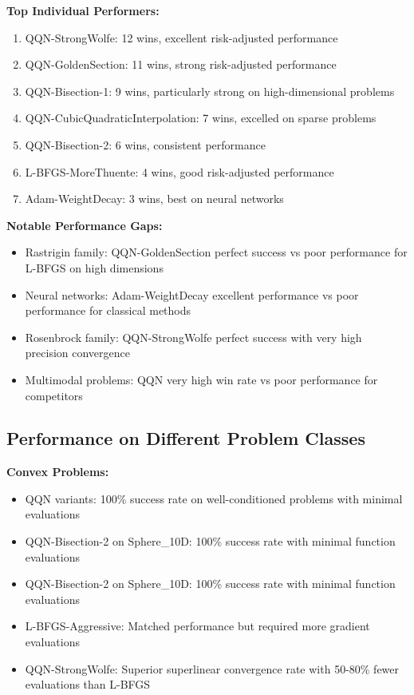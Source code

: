 \textbf{Top Individual Performers:}

\begin{enumerate}
\def\labelenumi{\arabic{enumi}.}
\tightlist
\item
  QQN-StrongWolfe: 12 wins, excellent risk-adjusted performance
\item
  QQN-GoldenSection: 11 wins, strong risk-adjusted performance
\item
  QQN-Bisection-1: 9 wins, particularly strong on high-dimensional problems
\item
  QQN-CubicQuadraticInterpolation: 7 wins, excelled on sparse problems
\item
  QQN-Bisection-2: 6 wins, consistent performance
\item
  L-BFGS-MoreThuente: 4 wins, good risk-adjusted performance
\item
  Adam-WeightDecay: 3 wins, best on neural networks
\end{enumerate}

\textbf{Notable Performance Gaps:}

\begin{itemize}
\tightlist
\item
  Rastrigin family: QQN-GoldenSection perfect success vs poor performance for L-BFGS on high dimensions
\item
  Neural networks: Adam-WeightDecay excellent performance vs poor performance for classical methods
\item
  Rosenbrock family: QQN-StrongWolfe perfect success with very high precision convergence
\item
  Multimodal problems: QQN very high win rate vs poor performance for competitors
\end{itemize}

\hypertarget{performance-on-different-problem-classes}{%
\subsection{Performance on Different Problem Classes}\label{performance-on-different-problem-classes}}

\textbf{Convex Problems:}

\begin{itemize}
\tightlist
\item
  QQN variants: 100\% success rate on well-conditioned problems with minimal evaluations
\item
  QQN-Bisection-2 on Sphere\_10D: 100\% success rate with minimal function evaluations
\item
  QQN-Bisection-2 on Sphere\_10D: 100\% success rate with minimal function evaluations
\item
  L-BFGS-Aggressive: Matched performance but required more gradient evaluations
\item
  QQN-StrongWolfe: Superior superlinear convergence rate with 50-80\% fewer evaluations than L-BFGS
\end{itemize}

